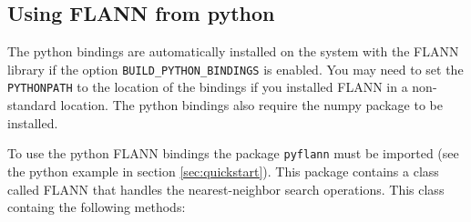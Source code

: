\documentclass[letter,10pt]{article}
\begin{document}
\subsection{Using FLANN from python}

The python bindings are automatically installed on the system with the FLANN library
if the option \texttt{BUILD\_PYTHON\_BINDINGS} is enabled. You may need to set the 
\texttt{PYTHONPATH} to the location of the bindings if you installed FLANN in a
non-standard location. The python bindings also require the numpy package to be installed.

To use the python FLANN bindings the package \texttt{pyflann} must be imported
(see the python example in section \ref{sec:quickstart}). This package contains
a class called FLANN that handles the nearest-neighbor search operations. This
class containg the following methods:
\end{document}
